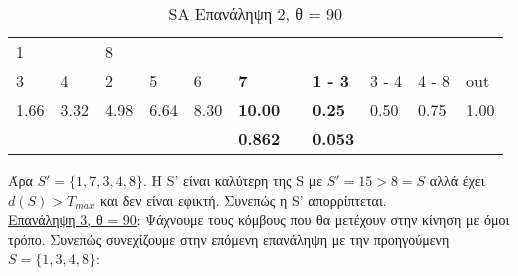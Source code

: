 \documentclass[12pt, a4paper]{article}
\begin{document}
\begin{table}[H]
\centering
\begin{tabular}{lllllllllll}
\multicolumn{1}{|l}{1}     & \multicolumn{1}{l|}{\textbf{}} & 8                         &                           &                          &                &                       &                                     &                            &                            &      \\
\multicolumn{1}{|l|}{3}    & \multicolumn{1}{l|}{4}         & \multicolumn{1}{l|}{2}    & \multicolumn{1}{l|}{5}    & \multicolumn{1}{l|}{6}   & \textbf{7}     & \multicolumn{1}{l|}{} & \multicolumn{1}{l|}{\textbf{1 - 3}} & \multicolumn{1}{l|}{3 - 4} & \multicolumn{1}{l|}{4 - 8} & out  \\ \cline{1-6} \cline{8-11} 
\multicolumn{1}{|l|}{1.66} & \multicolumn{1}{l|}{3.32}      & \multicolumn{1}{l|}{4.98} & \multicolumn{1}{l|}{6.64} & \multicolumn{1}{l|}{8.30} & \textbf{10.00}  & \multicolumn{1}{l|}{} & \multicolumn{1}{l|}{\textbf{0.25}}  & \multicolumn{1}{l|}{0.50}  & \multicolumn{1}{l|}{0.75}  & 1.00 \\
                           &                                &                           &                           &                          & \textbf{0.862} &                       & \textbf{0.053}                      &                            &                            &     
\end{tabular}
\caption{SA Επανάληψη 2, θ = 90}
\label{my-label}
\end{table}

Άρα \(S'=\{1,7,3,4,8\}\). Η S' είναι καλύτερη της S με \(S'=15>8=S\) αλλά έχει \(d(S) > T_{max}\) και δεν είναι εφικτή. Συνεπώς η S'  απορρίπτεται. \\


\underline{Επανάληψη 3, θ = 90}: Ψάχνουμε τους κόμβους που θα μετέχουν στην κίνηση με όμοι τρόπο. Συνεπώς συνεχίζουμε στην επόμενη επανάληψη με την προηγούμενη \(S = \{1,3,4,8\}\):
\end{document}
